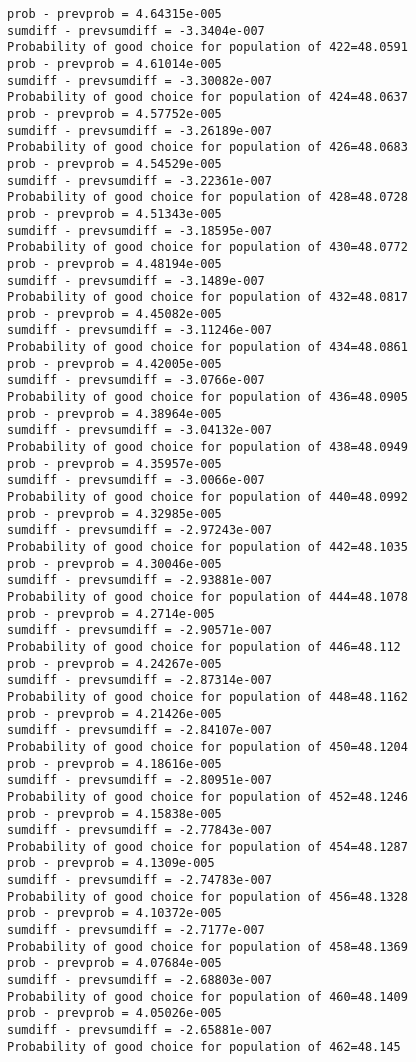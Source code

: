 \documentclass[11pt,onecolumn]{article}
\begin{document}
\begin{verbatim}
prob - prevprob = 4.64315e-005
sumdiff - prevsumdiff = -3.3404e-007
Probability of good choice for population of 422=48.0591
prob - prevprob = 4.61014e-005
sumdiff - prevsumdiff = -3.30082e-007
Probability of good choice for population of 424=48.0637
prob - prevprob = 4.57752e-005
sumdiff - prevsumdiff = -3.26189e-007
Probability of good choice for population of 426=48.0683
prob - prevprob = 4.54529e-005
sumdiff - prevsumdiff = -3.22361e-007
Probability of good choice for population of 428=48.0728
prob - prevprob = 4.51343e-005
sumdiff - prevsumdiff = -3.18595e-007
Probability of good choice for population of 430=48.0772
prob - prevprob = 4.48194e-005
sumdiff - prevsumdiff = -3.1489e-007
Probability of good choice for population of 432=48.0817
prob - prevprob = 4.45082e-005
sumdiff - prevsumdiff = -3.11246e-007
Probability of good choice for population of 434=48.0861
prob - prevprob = 4.42005e-005
sumdiff - prevsumdiff = -3.0766e-007
Probability of good choice for population of 436=48.0905
prob - prevprob = 4.38964e-005
sumdiff - prevsumdiff = -3.04132e-007
Probability of good choice for population of 438=48.0949
prob - prevprob = 4.35957e-005
sumdiff - prevsumdiff = -3.0066e-007
Probability of good choice for population of 440=48.0992
prob - prevprob = 4.32985e-005
sumdiff - prevsumdiff = -2.97243e-007
Probability of good choice for population of 442=48.1035
prob - prevprob = 4.30046e-005
sumdiff - prevsumdiff = -2.93881e-007
Probability of good choice for population of 444=48.1078
prob - prevprob = 4.2714e-005
sumdiff - prevsumdiff = -2.90571e-007
Probability of good choice for population of 446=48.112
prob - prevprob = 4.24267e-005
sumdiff - prevsumdiff = -2.87314e-007
Probability of good choice for population of 448=48.1162
prob - prevprob = 4.21426e-005
sumdiff - prevsumdiff = -2.84107e-007
Probability of good choice for population of 450=48.1204
prob - prevprob = 4.18616e-005
sumdiff - prevsumdiff = -2.80951e-007
Probability of good choice for population of 452=48.1246
prob - prevprob = 4.15838e-005
sumdiff - prevsumdiff = -2.77843e-007
Probability of good choice for population of 454=48.1287
prob - prevprob = 4.1309e-005
sumdiff - prevsumdiff = -2.74783e-007
Probability of good choice for population of 456=48.1328
prob - prevprob = 4.10372e-005
sumdiff - prevsumdiff = -2.7177e-007
Probability of good choice for population of 458=48.1369
prob - prevprob = 4.07684e-005
sumdiff - prevsumdiff = -2.68803e-007
Probability of good choice for population of 460=48.1409
prob - prevprob = 4.05026e-005
sumdiff - prevsumdiff = -2.65881e-007
Probability of good choice for population of 462=48.145

\end{verbatim}
\end{document}
